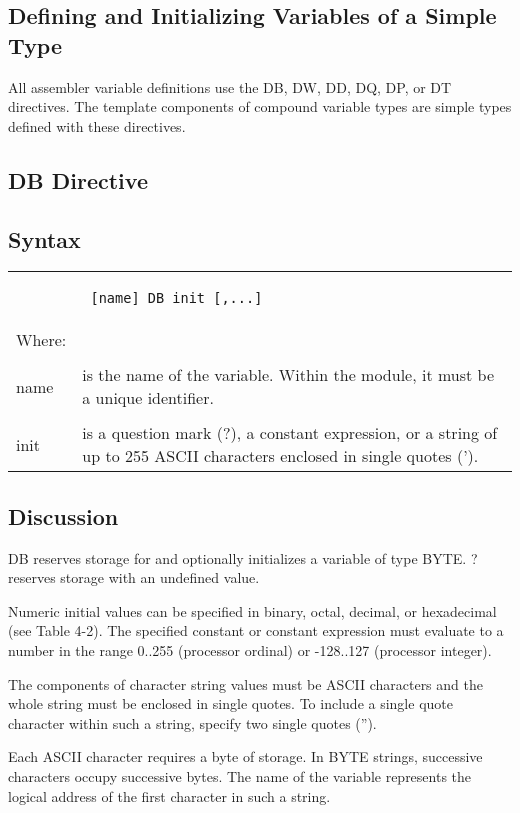 \subsection*{Defining and Initializing Variables of a Simple Type}
All assembler variable definitions use the DB, DW, DD, DQ, DP, or DT directives. The template components of compound variable types are simple types defined with these directives.

\subsection*{DB Directive}
\subsection*{Syntax}
\begin{tabular}{p{2cm} p{12.5cm}}
& \begin{verbatim} [name] DB init [,...] \end{verbatim} \\
Where: & \\
& \\
name & is the name of the variable. Within the module, it must be a unique identifier. \\
& \\
init & is a question mark (?), a constant expression, or a string of up to 255 ASCII characters enclosed in single quotes ('). \\
\end{tabular}
\subsection*{Discussion}
DB reserves storage for and optionally initializes a variable of type BYTE. ? reserves storage with an undefined value.

Numeric initial values can be specified in binary, octal, decimal, or hexadecimal (see Table 4-2). The specified constant or constant expression must evaluate to a number in the range 0..255 (processor ordinal) or -128..127 (processor integer).

The components of character string values must be ASCII characters and the whole string must be enclosed in single quotes. To include a single quote character within such a string, specify two single quotes ('').

Each ASCII character requires a byte of storage. In BYTE strings, successive characters occupy successive bytes. The name of the variable represents the logical address of the first character in such a string.

